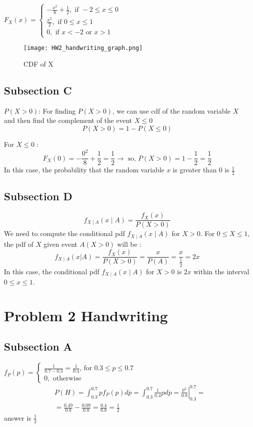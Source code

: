 \documentclass[a4paper,11pt]{article}
\theoremstyle{mytheor}
\begin{document}
$F_X(x)=\left\{\begin{array}{l}-\frac{x^2}{8}+\frac{1}{2}, \text { if }-2 \leq x \leq 0 \\ \frac{x^2}{2}, \text { if } 0 \leq x \leq 1 \\ 0, \text { if } x<-2 \text { or } x>1\end{array}\right.$
\begin{figure}[H]
    \centering
    \texttt{[image: HW2\_handwriting\_graph.png]}
    \caption{CDF of X}
    \label{fig:enter-label}
\end{figure}

\newpage
\subsection{Subsection C}
$P(X>0)$: For finding $P(X>0)$, we can use cdf of the random variable $X$ and then find the complement of the event $X \leq 0$
$$
P(X>0)=1-P(X \leq 0)
$$

For $X \leq 0$ :
$$
F_X(0)=-\frac{0^2}{8}+\frac{1}{2}=\frac{1}{2} \rightarrow \text { so, } P(X>0)=1-\frac{1}{2}=\frac{1}{2}
$$
In this case, the probability that the random variable $x$ is greater than 0 is $\frac{1}{2}$
\subsection{Subsection D}
$$
f_{X \mid A}(x \mid A)=\frac{f_X(x)}{P(X>0)}
$$
We need to compute the conditional pdf $f_{X \mid A}(x \mid A)$ for $X>0$. For $0 \leqslant X \leqslant 1$, the pdf of $X$ given event $A(X>0)$ will be :
$$
f_{X \mid A}(x | A)=\frac{f_X(x)}{P(X>0)}=\frac{x}{P(A)}=\frac{x}{\frac{1}{2}}=2 x
$$
In this case, the conditional pdf $f_{X \mid A}(x \mid A)$ for $X>0$ is $2 x$ within the interval $0 \leq x \leq 1$.


\section{Problem 2 Handwriting}
\subsection{Subsection A}
$f_P(p)=\left\{\begin{array}{c}\frac{1}{0.7-0.3}=\frac{1}{0.4} \text {, for } 0.3 \leqslant p \leqslant 0.7 \\ 0, \text { otherwise }\end{array}\right.$
$$
\begin{aligned}
& P(H)=\int_{0.3}^{0.7} p f_P(p) d p=\int_{0.3}^{0.7} \frac{1}{0.4} p d p=\left.\frac{p^2}{0.8}\right|_{0.3} ^{0.7}= \\
& =\frac{0.49}{0.8}-\frac{0.09}{0.8}=\frac{0.4}{0.8}=\frac{1}{2}
\end{aligned}
$$
answer is $\frac{1}{2}$ \\
\end{document}

